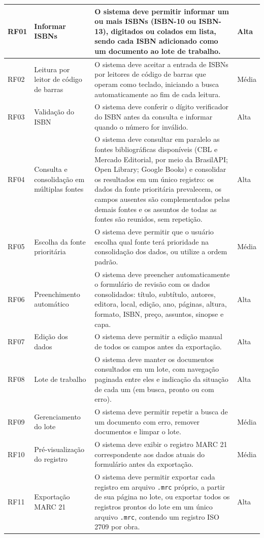 \begin{apendicesenv}
\begin{longtable}{|p{}|p{}|p{}|p{}|}
    RF01 & Informar ISBNs & O sistema deve permitir informar um ou mais ISBNs (ISBN-10 ou ISBN-13), digitados ou colados em lista, sendo cada ISBN adicionado como um documento ao lote de trabalho. & Alta \\ \hline
    RF02 & Leitura por leitor de código de barras & O sistema deve aceitar a entrada de ISBNs por leitores de código de barras que operam como teclado, iniciando a busca automaticamente ao fim de cada leitura. & Média \\ \hline
    RF03 & Validação do ISBN & O sistema deve conferir o dígito verificador do ISBN antes da consulta e informar quando o número for inválido. & Alta \\ \hline
    RF04 & Consulta e consolidação em múltiplas fontes & O sistema deve consultar em paralelo as fontes bibliográficas disponíveis (CBL e Mercado Editorial, por meio da BrasilAPI; Open Library; Google Books) e consolidar os resultados em um único registro: os dados da fonte prioritária prevalecem, os campos ausentes são complementados pelas demais fontes e os assuntos de todas as fontes são reunidos, sem repetição. & Alta \\ \hline
    RF05 & Escolha da fonte prioritária & O sistema deve permitir que o usuário escolha qual fonte terá prioridade na consolidação dos dados, ou utilize a ordem padrão. & Média \\ \hline
    RF06 & Preenchimento automático & O sistema deve preencher automaticamente o formulário de revisão com os dados consolidados: título, subtítulo, autores, editora, local, edição, ano, páginas, altura, formato, ISBN, preço, assuntos, sinopse e capa. & Alta \\ \hline
    RF07 & Edição dos dados & O sistema deve permitir a edição manual de todos os campos antes da exportação. & Alta \\ \hline
    RF08 & Lote de trabalho & O sistema deve manter os documentos consultados em um lote, com navegação paginada entre eles e indicação da situação de cada um (em busca, pronto ou com erro). & Alta \\ \hline
    RF09 & Gerenciamento do lote & O sistema deve permitir repetir a busca de um documento com erro, remover documentos e limpar o lote. & Média \\ \hline
    RF10 & Pré-visualização do registro & O sistema deve exibir o registro MARC 21 correspondente aos dados atuais do formulário antes da exportação. & Média \\ \hline
    RF11 & Exportação MARC 21 & O sistema deve permitir exportar cada registro em arquivo \texttt{.mrc} próprio, a partir de sua página no lote, ou exportar todos os registros prontos do lote em um único arquivo \texttt{.mrc}, contendo um registro ISO 2709 por obra. & Alta \\ \hline

\end{longtable}
\end{apendicesenv}

